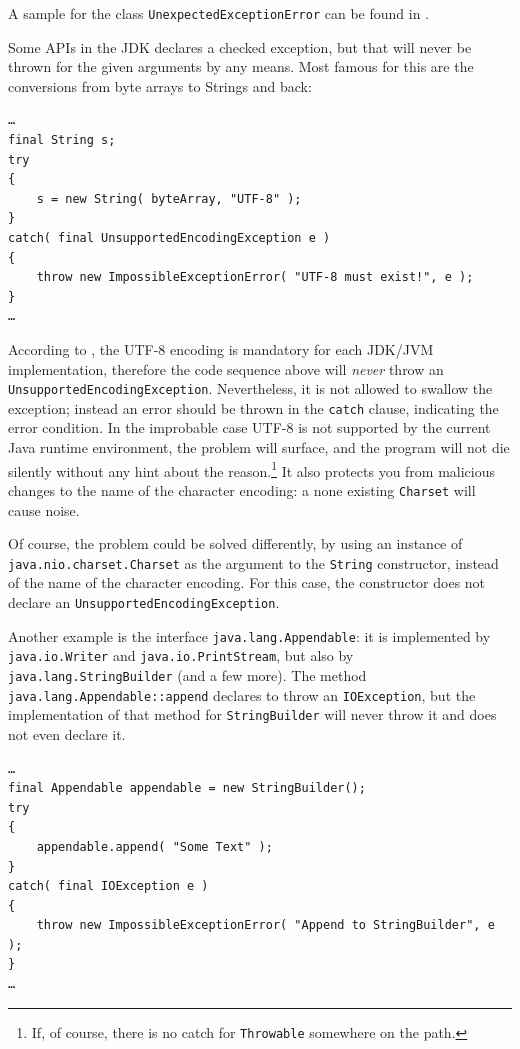 \documentclass[11pt,a4paper, titlepage, parskip=half, headsepline, footsepline, cleardoublepage=current, headheight=1cm]{scrbook}
\begin{document}
A sample for the class \lstinline|UnexpectedExceptionError| can be found in \autocite{TQUADRAT_ORG_FOUNDATION_UNEXPECTEDEXCEPTIONERROR}.

Some APIs in the JDK declares a checked exception, but that will never be thrown for the given arguments by any means. Most famous for this are the conversions from byte arrays to Strings and back:
\begin{lstlisting}
…
final String s;
try
{
    s = new String( byteArray, "UTF-8" );
}
catch( final UnsupportedEncodingException e )
{
    throw new ImpossibleExceptionError( "UTF-8 must exist!", e );
}
…
\end{lstlisting}

According to \autocite{ORACLE_DOC_CHARSET:StandardCharsets}, the UTF-8 encoding is mandatory for each JDK/JVM implementation, therefore the code sequence above will \textit{never} throw an \lstinline|UnsupportedEncodingException|. Nevertheless, it is not allowed to swallow the exception; instead an error should be thrown in the \lstinline|catch| clause, indicating the error condition. In the improbable case UTF-8 is not supported by the current Java runtime environment, the problem will surface, and the program will not die silently without any hint about the reason.\footnote{If, of course, there is no catch for \lstinline|Throwable| somewhere on the path.} It also protects you from malicious changes to the name of the character encoding: a none existing \lstinline|Charset| will cause noise.

Of course, the problem could be solved differently, by using an instance of \lstinline|java.nio.charset.Charset|\autocite{ORACLE_DOC_CHARSET_CLASS} as the argument to the \lstinline|String| constructor, instead of the name of the character encoding. For this case, the constructor does not declare an \lstinline|UnsupportedEncodingException|. 

Another example is the interface \lstinline|java.lang.Appendable|\autocite{ORACLE_DOC_APPENDABLE_INTERFACE}: it is implemented by \lstinline|java.io.Writer| and \lstinline|java.io.PrintStream|, but also by \lstinline|java.lang.StringBuilder| (and a few more). The method \lstinline|java.lang.Appendable::append| declares to throw an \lstinline|IOException|, but the implementation of that method for \lstinline|StringBuilder| will never throw it and does not even declare it.
\begin{lstlisting}
…
final Appendable appendable = new StringBuilder();
try
{
    appendable.append( "Some Text" );
}
catch( final IOException e )
{
    throw new ImpossibleExceptionError( "Append to StringBuilder", e );
}
…
\end{lstlisting}
\end{document}
